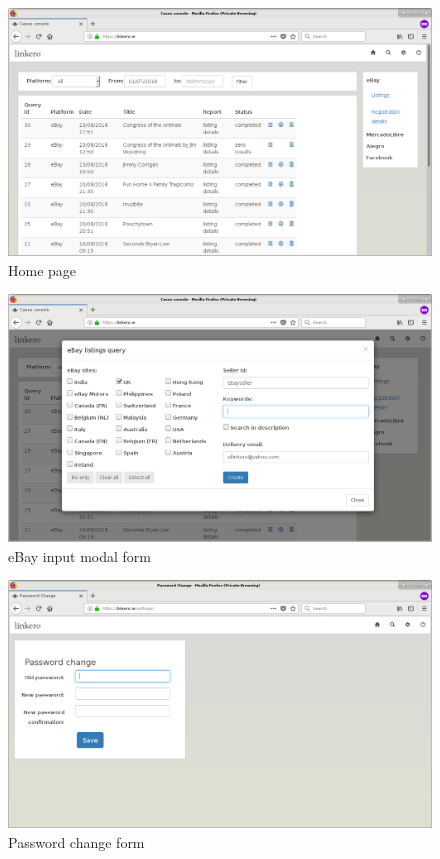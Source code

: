 \begin{figure}[H]
\centering
\includegraphics[scale=0.3]{imgs/HomeScreen.png}
\caption{Home page}
\label{fig:home}
\end{figure}

\begin{figure}[H]
\centering
\includegraphics[scale=0.3]{imgs/InputForm.png}
\caption{eBay input modal form}
\label{fig:inputform}
\end{figure}

\begin{figure}[H]
\centering
\includegraphics[scale=0.3]{imgs/PasswdChange.png}
\caption{Password change form}
\label{fig:pwdform}
\end{figure}

